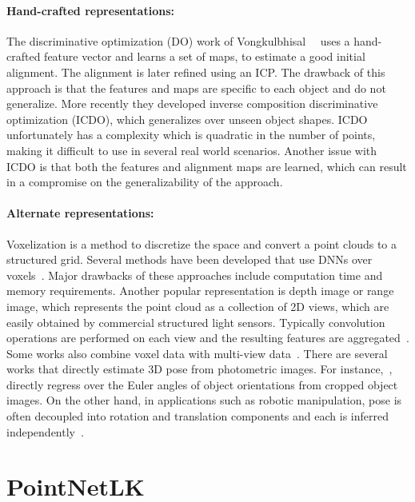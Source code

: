 \documentclass[10pt,twocolumn,letterpaper]{article}
\begin{document}
\paragraph{Hand-crafted representations:} 
The discriminative optimization (DO) work of Vongkulbhisal~\etal~\cite{vongkulbhisal2017discriminative} uses a hand-crafted feature vector and learns a set of maps, to estimate a good initial alignment. The alignment is later refined using an ICP. The drawback of this approach is that the features and maps are specific to each object and do not generalize. More recently they developed inverse composition discriminative optimization (ICDO), which generalizes over unseen object shapes. ICDO unfortunately has a complexity which is quadratic in the number of points, making it difficult to use in several real world scenarios. Another issue with ICDO is that both the features and alignment maps are learned, which can result in a compromise on the generalizability of the approach.

\paragraph{Alternate representations:}
Voxelization is a method to discretize the space and convert a point clouds to a structured grid. Several methods have been developed that use DNNs over voxels~\cite{maturana2015voxnet, wu20153d}. Major drawbacks of these approaches include computation time and memory requirements. Another popular representation is depth image or range image, which represents the point cloud as a collection of 2D views, which are easily obtained by commercial structured light sensors. Typically convolution operations are performed on each view and the resulting features are  aggregated~\cite{su2015multi}. Some works also combine voxel data with multi-view data~\cite{qi2016volumetric,balntas2017pose}. There are several works that directly estimate 3D pose from photometric images. For instance,~\cite{su2015render, kendall2015posenet, massa2016crafting, xiang2016objectnet3d, mousavian20173d}, directly regress over the Euler angles of object orientations from cropped object images. On the other hand, in applications such as robotic manipulation, pose is often decoupled into rotation and translation components and each is inferred independently~\cite{su2015render, tekin2017real, kehl2017ssd, xiang2017posecnn, rad2017bb8, li2018unified}.



\section{PointNetLK}
\end{document}
